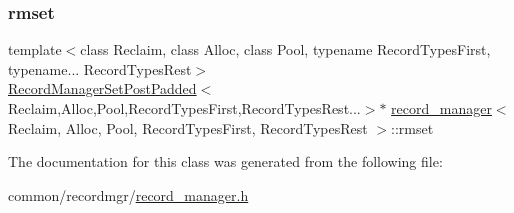 \subsubsection{\texorpdfstring{rmset}{rmset}}
{\footnotesize\ttfamily template$<$class Reclaim, class Alloc, class Pool, typename Record\+Types\+First, typename... Record\+Types\+Rest$>$ \\
\hyperlink{classRecordManagerSetPostPadded}{Record\+Manager\+Set\+Post\+Padded}$<$Reclaim,Alloc,Pool,Record\+Types\+First,Record\+Types\+Rest...$>$$\ast$ \hyperlink{classrecord__manager}{record\+\_\+manager}$<$ Reclaim, Alloc, Pool, Record\+Types\+First, Record\+Types\+Rest $>$\+::rmset\hspace{0.3cm}{\ttfamily [protected]}}



The documentation for this class was generated from the following file\+:\begin{DoxyCompactItemize}
\item 
common/recordmgr/\hyperlink{record__manager_8h}{record\+\_\+manager.\+h}\end{DoxyCompactItemize}
